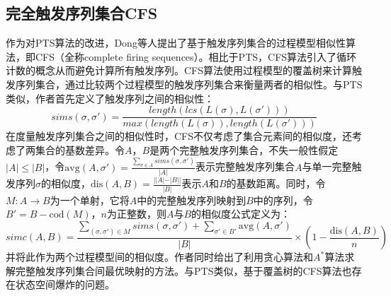 \subsection{完全触发序列集合CFS}\label{subsec:cfs}
作为对PTS算法的改进，Dong等人提出了基于触发序列集合的过程模型相似性算法，即CFS（全称complete firing sequences）\cite{dong2014cfs}。相比于PTS，CFS算法引入了循环计数的概念从而避免计算所有触发序列。CFS算法使用过程模型的覆盖树来计算触发序列集合，通过比较两个过程模型的触发序列集合来衡量两者的相似性。与PTS类似，作者首先定义了触发序列之间的相似性：
\begin{displaymath}
  sims(\sigma,\sigma')=\frac{length(lcs(L(\sigma),L(\sigma')))}{max(length(L(\sigma)),length(L(\sigma')))}
\end{displaymath}
在度量触发序列集合之间的相似性时，CFS不仅考虑了集合元素间的相似度，还考虑了两集合的基数差异。令$A$，$B$是两个完整触发序列集合，不失一般性假定$|A|\leq|B|$，令$\text{avg}(A,\sigma')=\frac{\sum_{\sigma\in A}sims(\sigma,\sigma')}{|A|}$表示完整触发序列集合$A$与单一完整触发序列$\sigma$的相似度，$\text{dis}(A,B)=\frac{||A|-|B||}{|B|}$表示$A$和$B$的基数距离。同时，令$M:A\rightarrow B$为一个单射，它将$A$中的完整触发序列映射到$B$中的序列，令$B'=B-\text{cod}(M)$，$n$为正整数，则$A$与$B$的相似度公式定义为：
\begin{displaymath}
  simc(A,B)=\frac{\sum_{(\sigma,\sigma')\in M}sims(\sigma,\sigma')+\sum_{\sigma'\in B'}\text{avg}(A,\sigma')}{|B|}\times(1-\frac{\text{dis}(A,B)}{n})
\end{displaymath}
并将此作为两个过程模型间的相似度。作者同时给出了利用贪心算法和$A^{*}$算法求解完整触发序列集合间最优映射的方法。与PTS类似，基于覆盖树的CFS算法也存在状态空间爆炸的问题。

